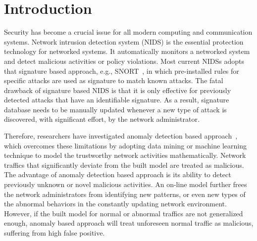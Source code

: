 \section{Introduction}
Security has become a crucial issue for all modern computing and communication systems.
Network intrusion detection system (NIDS) is the essential protection technology for networked systems.
It automatically monitors a networked system and detect malicious activities or policy violations.
Most current NIDSs adopts that signature based approach, e.g., SNORT~\cite{Snort}, in which
pre-installed rules for specific attacks are used as signature to match known attacks.
The fatal drawback of signature based NIDS is that
it is only effective for previously detected attacks that have an identifiable signature.
As a result, signature database needs to be manually updated whenever a new type of attack
is discovered, with significant effort, by the network administrator.

Therefore, researchers have investigated anomaly detection based approach~\cite{STL-NIDS, LOF, RankingOutliner, NB-Tree, RampLossKSVCR, GAA-ADS},
which overcomes these limitations by adopting data mining or machine learning technique to
model the trustworthy network activities mathematically.
Network traffics that significantly deviate from the built model are treated as malicious.
The advantage of anomaly detection based approach is its ability to detect previously unknown or novel malicious activities.
An on-line model further frees the network administrators from identifying new patterns,
or even new types of the abnormal behaviors in the constantly updating network environment.
However, if the built model for normal or abnormal traffics are not generalized enough,
anomaly based approach will treat unforeseen normal traffic as malicious,
suffering from high false positive.


